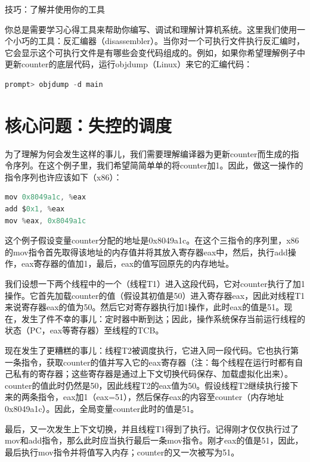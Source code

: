 \begin{tcolorbox}[colframe=grey,colback= grey,arc=0pt,left=6pt,right=6pt,top=6pt,bottom=6pt,boxsep=0pt]
\begin{center}技巧：了解并使用你的工具
\end{center}

你总是需要学习心得工具来帮助你编写、调试和理解计算机系统。这里我们使用一个小巧的工具：反汇编器（disassembler）。当你对一个可执行文件执行反汇编时，它会显示这个可执行文件是有哪些会变代码组成的。例如，如果你希望理解例子中更新counter的底层代码，运行objdump（Linux）来它的汇编代码：
\begin{lstlisting}[language=C]
prompt> objdump -d main
\end{lstlisting}
\end{tcolorbox}

\section{核心问题：失控的调度}
为了理解为何会发生这样的事儿，我们需要理解编译器为更新counter而生成的指令序列。在这个例子里，我们希望简简单单的将counter加1。因此，做这一操作的指令序列也许应该如下（x86）：
\begin{lstlisting}[language=C]
mov 0x8049a1c, %eax
add $0x1, %eax
mov %eax, 0x8049a1c
\end{lstlisting}

这个例子假设变量counter分配的地址是0x8049a1c。在这个三指令的序列里，x86的mov指令首先取得该地址的内存值并将其放入寄存器eax中，然后，执行add操作，eax寄存器的值加1，最后，eax的值写回原先的内存地址。

我们设想一下两个线程中的一个（线程T1）进入这段代码，它对counter执行了加1操作。它首先加载counter的值（假设其初值是50）进入寄存器eax，因此对线程T1来说寄存器eax的值为50。然后它对寄存器执行加1操作，此时eax的值是51。现在，发生了件不幸的事儿：定时器中断到达；因此，操作系统保存当前运行线程的状态（PC，eax等寄存器）至线程的TCB。

现在发生了更糟糕的事儿：线程T2被调度执行，它进入同一段代码。它也执行第一条指令，获取counter的值并写入它的eax寄存器（注：每个线程在运行时都有自己私有的寄存器；这些寄存器是通过上下文切换代码保存、加载虚拟化出来）。counter的值此时仍然是50，因此线程T2的eax值为50。假设线程T2继续执行接下来的两条指令，eax加1（eax=51），然后保存eax的内容至counter（内存地址0x8049a1c）。因此，全局变量counter此时的值是51。

最后，又一次发生上下文切换，并且线程T1得到了执行。记得刚才仅仅执行过了mov和add指令，那么此时应当执行最后一条mov指令。刚才eax的值是51，因此，最后执行mov指令并将值写入内存；counter的又一次被写为51。

